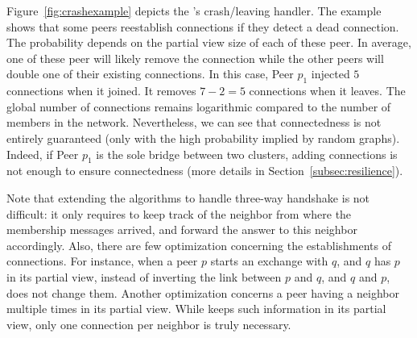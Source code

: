 \begin{figure*}
  \centering
  \hspace{10pt}
  \hspace{10pt}
  \caption{\label{fig:crashexample}Example of \SPRAY{}'s crash/leaving
    handler. The scenario follows from prior examples after few other
    exchanges. Peer $p_1$ leaves the network without giving notice. With it,
    $7$ connections are down. Peers $p_3$, $p_4$, and $p_5$ have the
    crashed/left peer in their partial view. Peer $p_5$ has
    $1-{1\over{|\mathcal{P}_5|}}={2\over{3}}$ chance to replace the dead
    connections. In this case, it doubles the connection to
    $p_{13}$. Identically, $p_3$ and $p_4$ detect the crash/leaving and run the
    appropriate procedure. Only $p_3$ doubles one of its connection. In total,
    $5$ connections have been removed.}
\end{figure*}

Figure~\ref{fig:crashexample} depicts the \SPRAY{}'s crash/leaving
handler. The example shows that some peers reestablish connections if they
detect a dead connection. The probability depends on the partial view size of
each of these peer. In average, one of these peer will likely remove the
connection while the other peers will double one of their existing
connections. In this case, Peer $p_1$ injected $5$ connections when it
joined. It removes $7-2 =5 $ connections when it leaves. The global number of
connections remains logarithmic compared to the number of members in the
network. Nevertheless, we can see that connectedness is not entirely guaranteed
(only with the high probability implied by random graphs). Indeed, if Peer
$p_1$ is the sole bridge between two clusters, adding connections is not enough
to ensure connectedness (more details in Section~\ref{subsec:resilience}).

Note that extending the algorithms to handle three-way handshake is not
difficult: it only requires to keep track of the neighbor from where the
membership messages arrived, and forward the answer to this neighbor
accordingly. Also, there are few optimization concerning the establishments of
connections. For instance, when a peer $p$ starts an exchange with $q$, and $q$
has $p$ in its partial view, instead of inverting the link between $p$ and $q$,
and $q$ and $p$, \SPRAY{} does not change them. Another optimization
concerns a peer having a neighbor multiple times in its partial view. While
\SPRAY{} keeps such information in its partial view, only one connection per
neighbor is truly necessary.

